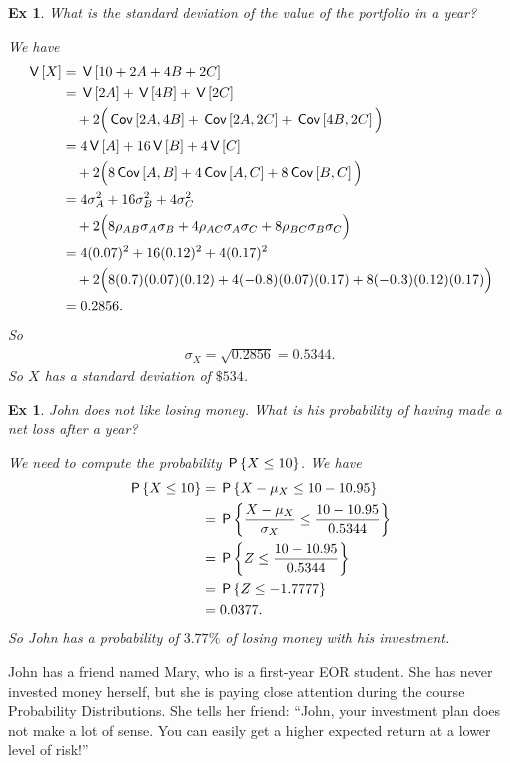 \documentclass[a4paper,11pt]{article}
\newtheorem{exercise}[theorem]{Ex}
\begin{document}
\begin{exercise}
What is the standard deviation of the value of the portfolio in a year?
\begin{solution}
We have
\begin{align}
    \V{X} &= \V{ 10 + 2A + 4B + 2C} \\
    &= \V{2A} + \V{4B} + \V{2C} \\
    &\quad +2\Big( \cov{2A, 4B} + \cov{2A, 2C} + \cov{4B, 2C} \Big) \\
    &= 4\V{A} + 16\V{B} + 4\V{C}\\
    &\quad +2\Big( 8\cov{A, B} + 4\cov{A, C} + 8\cov{B, C} \Big) \\
    &= 4\sigma_A^2 + 16\sigma_B^2 + 4\sigma_C^2 \\
    &\quad +2\Big( 8\rho_{AB}\sigma_A \sigma_B + 4\rho_{AC}\sigma_A \sigma_C + 8\rho_{BC}\sigma_B \sigma_C \Big) \\
    &= 4(0.07)^2 + 16(0.12)^2 + 4(0.17)^2 \\
    &\quad +2\Big( 8(0.7)(0.07) (0.12) + 4(-0.8)(0.07)(0.17) + 8(-0.3)(0.12) (0.17)\Big) \\
    &= 0.2856.
\end{align}
So
\begin{align}
    \sigma_X = \sqrt{0.2856} = 0.5344.
\end{align}
So $X$ has a standard deviation of $\$534$.
\end{solution}
\end{exercise}

\begin{exercise}
John does not like losing money. What is his probability of having made a net loss after a year?
\begin{solution}
We need to compute the probability $\P{X \leq 10}$. We have
\begin{align}
    \P{X \leq 10}
 &= \P{ X - \mu_X \leq 10 - 10.95} \\
    &= \P{ \frac{X - \mu_X}{\sigma_X} \leq \frac{10 - 10.95}{0.5344} } \\
    &= \P{ Z \leq \frac{10 - 10.95}{0.5344} } \\
    &= \P{ Z \leq -1.7777 } \\
    &= 0.0377.
\end{align}
So John has a probability of $3.77\%$ of losing money with his investment.
\end{solution}
\end{exercise}

John has a friend named Mary, who is a first-year EOR student. She has never invested money herself, but she is paying close attention during the course Probability Distributions. She tells her friend: ``John, your investment plan does not make a lot of sense. You can easily get a higher expected return at a lower level of risk!''
\end{document}

